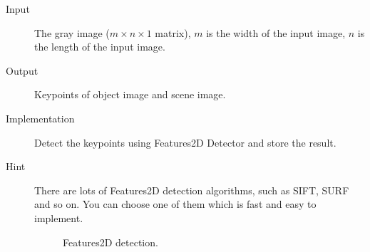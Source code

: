 \documentclass[12pt]{article}
\begin{document}
\begin{description}
\item[Input] The gray image ($m \times n \times 1$ matrix), $m$ is the width of the input image, $n$ is the length of the input image. 
\item[Output]  Keypoints of object image and scene image. 
\item[Implementation] Detect the keypoints using Features2D Detector and store the result.
\item[Hint] There are lots of Features2D detection algorithms, such as SIFT, SURF and so on. You can choose one of them which is fast and easy to implement.
\begin{figure}[!ht]
  \centering 
  \caption{Features2D detection.}
  \label{fig:Features2D} %
\end{figure}
\end{description}
\end{document}
